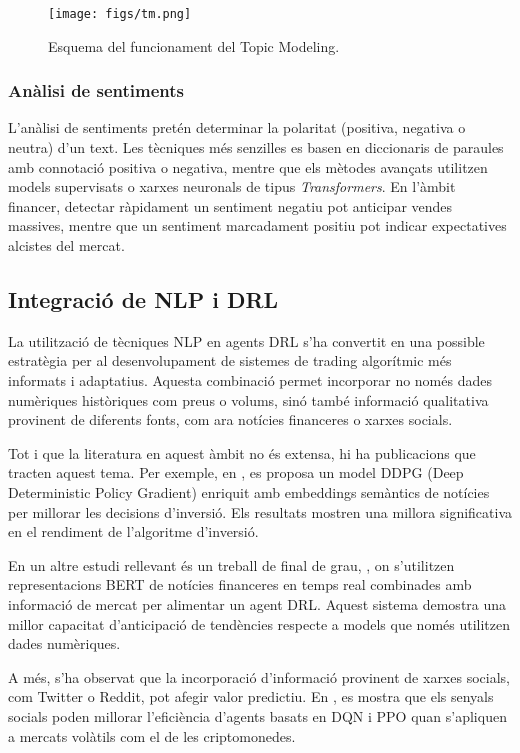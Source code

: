 \documentclass[12pt,a4paper,twoside]{book}
\begin{document}
\begin{figure}[H]
	\centering
	\texttt{[image: figs/tm.png]}
	\caption{Esquema del funcionament del Topic Modeling\cite{esquemaRL}.}
	\label{fig:context-anoni1}
\end{figure}

\subsubsection{Anàlisi de sentiments}

L'anàlisi de sentiments pretén determinar la polaritat (positiva, negativa o neutra) d'un text. Les tècniques més senzilles es basen en diccionaris de paraules amb connotació positiva o negativa, mentre que els mètodes avançats utilitzen models supervisats o xarxes neuronals de tipus \emph{Transformers}. En l'àmbit financer, detectar ràpidament un sentiment negatiu pot anticipar vendes massives, mentre que un sentiment marcadament positiu pot indicar expectatives alcistes del mercat.


\subsection{Integració de NLP i DRL}

La utilització de tècniques NLP en agents DRL s'ha convertit en una possible estratègia per al desenvolupament de sistemes de trading algorítmic més informats i adaptatius. Aquesta combinació permet incorporar no només dades numèriques històriques com preus o volums, sinó també informació qualitativa provinent de diferents fonts, com ara notícies financeres o xarxes socials.

Tot i que la literatura en aquest àmbit no és extensa, hi ha publicacions que tracten aquest tema. Per exemple, en \cite{gangopadhyay}, es proposa un model DDPG (Deep Deterministic Policy Gradient) enriquit amb embeddings semàntics de notícies per millorar les decisions d'inversió. Els resultats mostren una millora significativa en el rendiment de l'algoritme d'inversió.

En un altre estudi rellevant és un treball de final de grau, \cite{alvarez2023real}, on s'utilitzen representacions BERT de notícies financeres en temps real combinades amb informació de mercat per alimentar un agent DRL. Aquest sistema demostra una millor capacitat d'anticipació de tendències respecte a models que només utilitzen dades numèriques.

A més, s'ha observat que la incorporació d'informació provinent de xarxes socials, com Twitter o Reddit, pot afegir valor predictiu. En \cite{DBLP}, es mostra que els senyals socials poden millorar l'eficiència d'agents basats en DQN i PPO quan s'apliquen a mercats volàtils com el de les criptomonedes.
\end{document}
